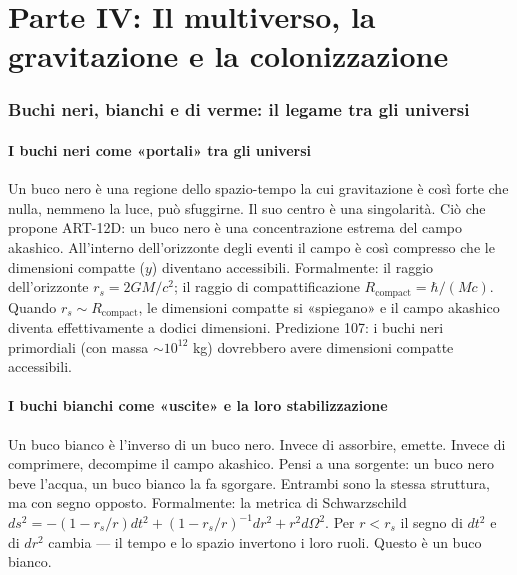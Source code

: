 \part*{Parte IV: Il multiverso, la gravitazione e la colonizzazione}

\section{Buchi neri, bianchi e di verme: il legame tra gli universi}
\subsection{I buchi neri come «portali» tra gli universi}
Un buco nero è una regione dello spazio-tempo la cui gravitazione è così forte che nulla, nemmeno la luce, può sfuggirne. Il suo centro è una singolarità. Ciò che propone ART-12D: un buco nero è una concentrazione estrema del campo akashico. All'interno dell'orizzonte degli eventi il campo è così compresso che le dimensioni compatte ($y$) diventano accessibili. Formalmente: il raggio dell'orizzonte $r_s = 2GM/c^2$; il raggio di compattificazione $R_{\text{compact}} = \hbar/(Mc)$. Quando $r_s \sim R_{\text{compact}}$, le dimensioni compatte si «spiegano» e il campo akashico diventa effettivamente a dodici dimensioni. Predizione 107: i buchi neri primordiali (con massa $\sim 10^{12}$ kg) dovrebbero avere dimensioni compatte accessibili.

\subsection{I buchi bianchi come «uscite» e la loro stabilizzazione}
Un buco bianco è l'inverso di un buco nero. Invece di assorbire, emette. Invece di comprimere, decompime il campo akashico. Pensi a una sorgente: un buco nero beve l'acqua, un buco bianco la fa sgorgare. Entrambi sono la stessa struttura, ma con segno opposto. Formalmente: la metrica di Schwarzschild $ds^2 = -(1-r_s/r)dt^2 + (1-r_s/r)^{-1}dr^2 + r^2 d\Omega^2$. Per $r < r_s$ il segno di $dt^2$ e di $dr^2$ cambia --- il tempo e lo spazio invertono i loro ruoli. Questo è un buco bianco.

